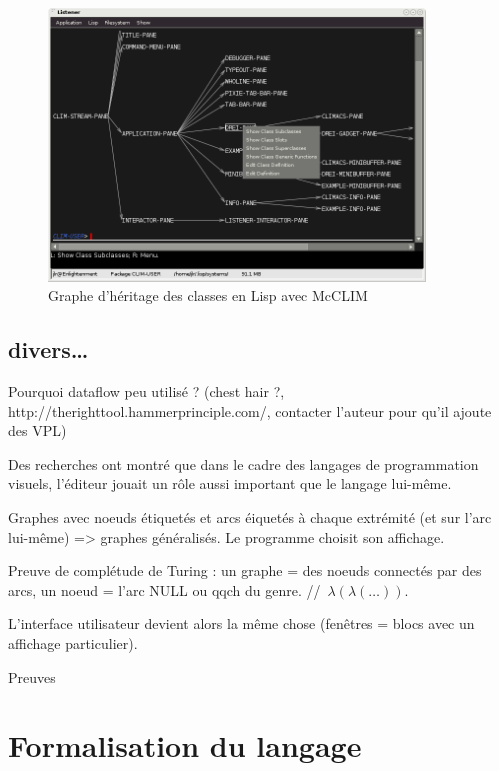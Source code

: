\documentclass{article}
\begin{document}
\begin{figure}[h!]
  \centering
  \includegraphics[width=10cm]{lisp-class-graph}
  \caption{Graphe d'héritage des classes en Lisp avec McCLIM}
\label{fig:lisp-class-graph}
\end{figure}

\subsection{divers…}
Pourquoi dataflow peu utilisé ? (chest hair ?, http://therighttool.hammerprinciple.com/, contacter l'auteur pour qu'il ajoute des VPL)

Des recherches ont montré que dans le cadre des langages de programmation visuels, l'éditeur jouait un rôle aussi important que le langage
lui-même.

Graphes avec noeuds étiquetés et arcs éiquetés à chaque extrémité (et sur l'arc lui-même) => graphes généralisés.
Le programme choisit son affichage.

Preuve de complétude de Turing : un graphe = des noeuds connectés par des arcs, un noeud = l'arc NULL ou qqch du
genre. //~$\lambda(\lambda(\dots))$.

L'interface utilisateur devient alors la même chose (fenêtres = blocs avec un affichage particulier).

Preuves

\section{Formalisation du langage}
\end{document}
